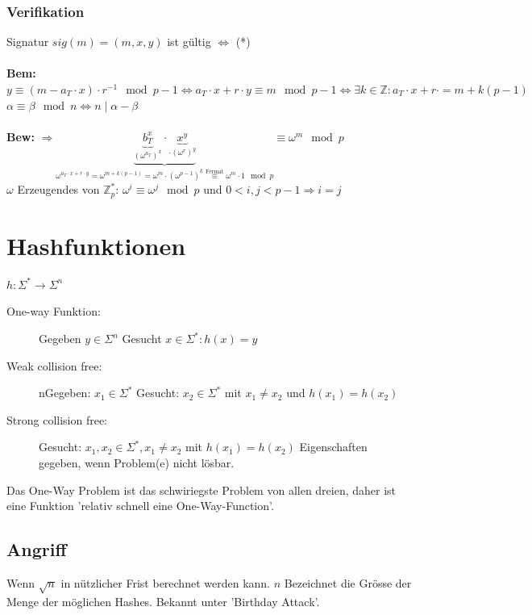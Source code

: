 \documentclass[10pt]{article}
\newcommand{\ZN}{\mathbb{Z}} %
\newcommand{\Bold}[1]{\textbf{#1}} %
\newcommand{\T}[1]{\text{#1}} %
\newcommand{\Lra}{\Leftrightarrow}
\newcommand{\Ra}{\Rightarrow}
\newcommand{\Oben}[2]{\overset{#1}{#2}} %
\begin{document}
\subsubsection{Verifikation}
Signatur $sig(m)=(m,x,y)$ ist gültig $\Lra$ (*)\\
\\
\Bold{Bem:} $y\equiv(m-a_T\cdot x)\cdot r^{-1}\mod p-1\Lra a_T\cdot x+r\cdot y\equiv m\mod p-1\Lra\exists k\in\ZN:a_T\cdot x+r\cdot=m+k(p-1)$\\
$\alpha\equiv\beta\mod n\Lra n\mid\alpha-\beta$\\
\\
\Bold{Bew:} $\Ra\underbrace{\underbrace{b_T^x}_{(\omega^{a_T})^x}\cdot\underbrace{x^y}_{\cdot(\omega^r)^y}}_{\omega^{a_T\cdot x+r\cdot y}=\omega^{m+k(p-1)}=\omega^m\cdot(\omega^{p-1})^k\Oben{\T{Fermat}}{\equiv}\omega^m\cdot1\mod p}\equiv\omega^m\mod p$\\
$\omega$ Erzeugendes von $\ZN_p^*$: $\omega^i\equiv\omega^j\mod p$ und $0<i,j<p-1\Ra i=j$



\newpage
\section{Hashfunktionen}
$h: \Sigma^* \rightarrow \Sigma^n$
\begin{description}
	\item[One-way Funktion:] Gegeben $y \in \Sigma^n$ Gesucht $x \in \Sigma^*: h(x) = y$
	\item[Weak collision free:]nGegeben: $x_1 \in \Sigma^*$ Gesucht: $x_2 \in \Sigma^*$ mit $x_1 \neq x_2$ und $h(x_1) = h(x_2)$
	\item[Strong collision free:] Gesucht: $x_1, x_2 \in \Sigma^*, x_1 \neq x_2$ mit $h(x_1) = h(x_2)$ Eigenschaften gegeben, wenn Problem(e) nicht lösbar.
\end{description}
Das One-Way Problem ist das schwiriegste Problem von allen dreien, daher ist eine Funktion 'relativ schnell eine One-Way-Function'.

\subsection{Angriff}
Wenn $\sqrt{n}$ in nützlicher Frist berechnet werden kann. $n$ Bezeichnet die Grösse der Menge der möglichen Hashes. Bekannt unter 'Birthday Attack'.
\end{document}
